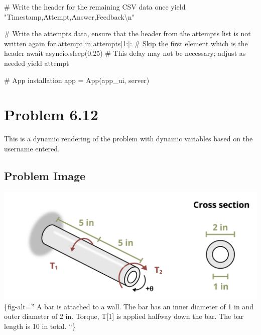 \documentclass[
  letterpaper,
  DIV=11,
  numbers=noendperiod]{scrreprt}
\newenvironment{Shaded}{\begin{snugshade}}{\end{snugshade}}
\newcommand{\NormalTok}[1]{\textcolor[rgb]{0.00,0.23,0.31}{#1}}
\begin{document}
\begin{Shaded}
\begin{Highlighting}[]
\NormalTok{        \# Write the header for the remaining CSV data once}
\NormalTok{        yield "Timestamp,Attempt,Answer,Feedback\textbackslash{}n"}
        
\NormalTok{        \# Write the attempts data, ensure that the header from the attempts list is not written again}
\NormalTok{        for attempt in attempts[1:]:  \# Skip the first element which is the header}
\NormalTok{            await asyncio.sleep(0.25)  \# This delay may not be necessary; adjust as needed}
\NormalTok{            yield attempt}


\NormalTok{\# App installation}
\NormalTok{app = App(app\_ui, server)}
\end{Highlighting}
\end{Shaded}

\chapter*{Problem 6.12}\label{problem-6.12}


This is a dynamic rendering of the problem with dynamic variables based
on the username entered.

\section*{Problem Image}\label{problem-image-42}


\includegraphics{images/268.png}\{fig-alt='' A bar is attached to a
wall. The bar has an inner diameter of 1 in and outer diameter of 2 in.
Torque, T{[}1{]} is applied halfway down the bar. The bar length is 10
in total. ``\}
\end{document}
